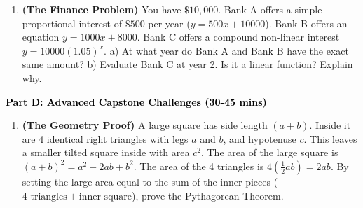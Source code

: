 \documentclass[12pt, letterpaper, fleqn]{article}
\begin{document}
\vspace{3mm}

\begin{enumerate}[itemsep=5.5cm, leftmargin=0.6cm, resume]
\item \textbf{(The Finance Problem)} You have $\$10,000$. Bank A offers a simple proportional interest of $\$500$ per year ($y = 500x + 10000$). Bank B offers an equation $y = 1000x + 8000$. Bank C offers a compound non-linear interest $y = 10000(1.05)^x$. 
a) At what year do Bank A and Bank B have the exact same amount?
b) Evaluate Bank C at year 2. Is it a linear function? Explain why.
\end{enumerate}

\newpage

\begin{tcolorbox}[colback=customteal!20]
\large\textcolor{black}{\textbf{Part D: Advanced Capstone Challenges (30-45 mins)}}
\end{tcolorbox}

\vspace{3mm}

\begin{enumerate}[itemsep=5.5cm, leftmargin=0.6cm, resume]
\item \textbf{(The Geometry Proof)} A large square has side length $(a+b)$. Inside it are 4 identical right triangles with legs $a$ and $b$, and hypotenuse $c$. This leaves a smaller tilted square inside with area $c^2$. The area of the large square is $(a+b)^2 = a^2 + 2ab + b^2$. The area of the 4 triangles is $4(\frac{1}{2}ab) = 2ab$. By setting the large area equal to the sum of the inner pieces ($4 \text{ triangles} + \text{inner square}$), prove the Pythagorean Theorem.
\end{enumerate}
\end{document}
